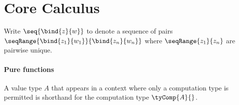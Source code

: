 \section{Core Calculus}



\begin{definition}
   Write $\seq{\bind{z}{w}}$ to denote a sequence of pairs $\seqRange{\bind{z_1}{w_1}}{\bind{z_n}{w_n}}$ where $\seqRange{z_1}{z_n}$ are pairwise unique.
\end{definition}

\paragraph{Pure functions}

A value type $A$ that appears in a context where only a computation type is permitted is shorthand for the computation type $\tyComp{A}{}$.




